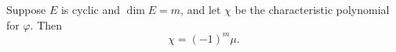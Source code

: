 Suppose $E$ is cyclic and $\dim E = m$, and let $\chi$ be the characteristic polynomial for $\varphi$. Then
$$\chi = (-1)^m \mu.$$
